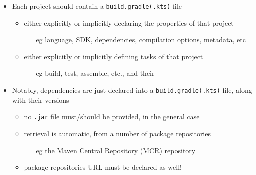 \documentclass[presentation]{beamer}\mode<presentation>{\usetheme{AMSBolognaFC}}
\begin{document}
\begin{frame}[allowframebreaks]
\begin{itemize}
        \bigskip

        \item Each project should contain a \alert{\texttt{build.gradle(.kts)}} file
        \begin{itemize}
            \item either explicitly or implicitly declaring the \alert{properties} of that project
            \begin{itemize}
                \item[eg] language, SDK, dependencies, compilation options, metadata, etc
            \end{itemize}

            \item either explicitly or implicitly defining \alert{tasks} of that project
            \begin{itemize}
                \item[eg] build, test, assemble, etc., and their
            \end{itemize}
        \end{itemize}

        \framebreak

        \item Notably, dependencies are just \alert{declared} into a \alert{\texttt{build.gradle(.kts)}} file, along with their versions
        \begin{itemize}
            \item no \texttt{.jar} file must/should be provided, in the general case
            \item retrieval is automatic, from a number of \alert{package repositories}
            \begin{itemize}
                \item[eg] the \href{https://search.maven.org/}{Maven Central Repository (MCR)} repository
            \end{itemize}
            \item package repositories URL must be declared as well!
        \end{itemize}

        \bigskip


\end{itemize}
\end{frame}
\end{document}
